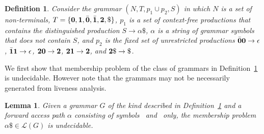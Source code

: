 \documentclass[9pt]{sigplanconf}
\newtheorem{proposition}[theorem]{Proposition}
\newtheorem{definition}[theorem]{Definition}
\newtheorem{lemma}[theorem]{Lemma}
\begin{document}
\begin{definition}\label{def:specialgrammar}
Consider the  grammar $(N,T,  p_1\cup p_2,S)$  in which
$N$ is  a set  of non-terminals,  $T =  \{\mathbf{0}, \mathbf{1},
\bar{\mathbf{0}},  \bar{\mathbf{1}},  {\mathbf{2}},  \$\}$,   $p_1$  is  a  set  of
context-free    productions     that    contains    the
distinguished  production   $S  \rightarrow  \alpha\$$,
$\alpha$ is a  string of grammar symbols  that does not
contain $S$, and $p_2$ is the fixed set of unrestricted
productions    $\bar{\mathbf{0}}\mathbf{0}    \rightarrow    \epsilon$,
$\bar{\mathbf{1}}\mathbf{1}    \rightarrow   \epsilon$,    ${\mathbf{2}}\mathbf{0}
\rightarrow {\mathbf{2}}$,  ${\mathbf{2}}\mathbf{1} \rightarrow {\mathbf{2}}$,
and $\clazy\$ \rightarrow \$ $.
\end{definition}

We first show that membership problem of the class of grammars in
Definition~\ref{def:specialgrammar} is undecidable. However note that
the grammars may not be necessarily generated from liveness analysis.
\newcommand{\state}{\ensuremath{\mathsf{S}}}
\newcommand{\nont}[2]{\ensuremath{\mathsf{S}_{#1}^{#2}}}  
\begin{lemma}\label{lemma:grammar-undecidable}
Given a grammar    $G$    of   the    kind    described    in
Definition~\ref{def:specialgrammar}  and a forward access path $\alpha$
consisting  of symbols \acar\  and \acdr\  only, the membership problem
$\alpha\$ \in \mathscr{L}(G)$ is undecidable.
\end{lemma} 
\end{document}
